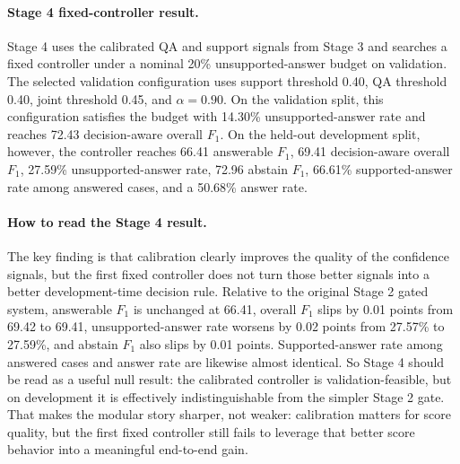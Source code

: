 \paragraph{Stage 4 fixed-controller result.}
Stage 4 uses the calibrated QA and support signals from Stage 3 and searches a
fixed controller under a nominal 20\% unsupported-answer budget on validation.
The selected validation configuration uses support threshold 0.40, QA
threshold 0.40, joint threshold 0.45, and \(\alpha = 0.90\).
On the validation split, this configuration satisfies the budget with
14.30\% unsupported-answer rate and reaches 72.43 decision-aware overall
\(F_1\).
On the held-out development split, however, the controller reaches 66.41
answerable \(F_1\), 69.41 decision-aware overall \(F_1\), 27.59\%
unsupported-answer rate, 72.96 abstain \(F_1\), 66.61\% supported-answer rate
among answered cases, and a 50.68\% answer rate.

\paragraph{How to read the Stage 4 result.}
The key finding is that calibration clearly improves the quality of the
confidence signals, but the first fixed controller does not turn those better
signals into a better development-time decision rule.
Relative to the original Stage 2 gated system, answerable \(F_1\) is
unchanged at 66.41, overall \(F_1\) slips by 0.01 points from 69.42 to 69.41,
unsupported-answer rate worsens by 0.02 points from 27.57\% to 27.59\%, and
abstain \(F_1\) also slips by 0.01 points.
Supported-answer rate among answered cases and answer rate are likewise almost
identical.
So Stage 4 should be read as a useful null result:
the calibrated controller is validation-feasible, but on development it is
effectively indistinguishable from the simpler Stage 2 gate.
That makes the modular story sharper, not weaker:
calibration matters for score quality, but the first fixed controller still
fails to leverage that better score behavior into a meaningful end-to-end
gain.

